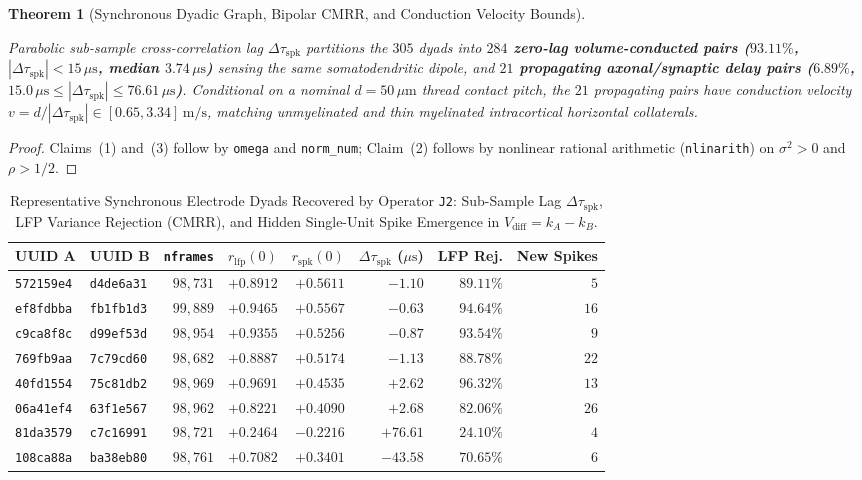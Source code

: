 \documentclass[11pt,letterpaper]{article}
\newtheorem{theorem}{Theorem}[section]
\theoremstyle{definition}
\begin{document}
\begin{theorem}[Synchronous Dyadic Graph, Bipolar CMRR, and Conduction Velocity Bounds]
\begin{enumerate}
  Parabolic sub-sample cross-correlation lag $\Delta\tau_{\mathrm{spk}}$ partitions the $305$ dyads into \textbf{$284$ zero-lag volume-conducted pairs ($93.11\%$, $|\Delta\tau_{\mathrm{spk}}| < 15\,\mu\text{s}$, median $3.74\,\mu\text{s}$)} sensing the same somatodendritic dipole, and \textbf{$21$ propagating axonal/synaptic delay pairs ($6.89\%$, $15.0\,\mu\text{s} \le |\Delta\tau_{\mathrm{spk}}| \le 76.61\,\mu\text{s}$)}. Conditional on a nominal $d = 50\,\mu\text{m}$ thread contact pitch, the $21$ propagating pairs have conduction velocity $v = d / |\Delta\tau_{\mathrm{spk}}| \in [0.65, 3.34]\,\text{m/s}$, matching unmyelinated and thin myelinated intracortical horizontal collaterals.
\end{enumerate}
\end{theorem}
\begin{proof}
Claims~(1) and~(3) follow by \texttt{omega} and \texttt{norm\_num}; Claim~(2) follows by nonlinear rational arithmetic (\texttt{nlinarith}) on $\sigma^2 > 0$ and $\rho > 1/2$.
\end{proof}

\begin{table}[htbp]
\centering
\caption{Representative Synchronous Electrode Dyads Recovered by Operator \texttt{J2}: Sub-Sample Lag $\Delta\tau_{\mathrm{spk}}$, LFP Variance Rejection (CMRR), and Hidden Single-Unit Spike Emergence in $V_{\mathrm{diff}} = k_A - k_B$.}
\label{tab:dyadic_pairs}
\footnotesize
\setlength{\tabcolsep}{5pt}
\begin{tabular}{@{}llrrrrrr@{}}
\toprule
\textbf{UUID A} & \textbf{UUID B} & \textbf{\texttt{nframes}} & \textbf{$r_{\mathrm{lfp}}(0)$} & \textbf{$r_{\mathrm{spk}}(0)$} & \textbf{$\Delta\tau_{\mathrm{spk}}$ ($\mu\text{s}$)} & \textbf{LFP Rej.} & \textbf{New Spikes} \\
\midrule
\texttt{572159e4} & \texttt{d4de6a31} & $98{,}731$ & $+0.8912$ & $+0.5611$ & $-1.10$ & $89.11\%$ & $5$ \\
\texttt{ef8fdbba} & \texttt{fb1fb1d3} & $99{,}889$ & $+0.9465$ & $+0.5567$ & $-0.63$ & $94.64\%$ & $16$ \\
\texttt{c9ca8f8c} & \texttt{d99ef53d} & $98{,}954$ & $+0.9355$ & $+0.5256$ & $-0.87$ & $93.54\%$ & $9$ \\
\texttt{769fb9aa} & \texttt{7c79cd60} & $98{,}682$ & $+0.8887$ & $+0.5174$ & $-1.13$ & $88.78\%$ & $22$ \\
\texttt{40fd1554} & \texttt{75c81db2} & $98{,}969$ & $+0.9691$ & $+0.4535$ & $+2.62$ & $96.32\%$ & $13$ \\
\texttt{06a41ef4} & \texttt{63f1e567} & $98{,}962$ & $+0.8221$ & $+0.4090$ & $+2.68$ & $82.06\%$ & $26$ \\
\texttt{81da3579} & \texttt{c7c16991} & $98{,}721$ & $+0.2464$ & $-0.2216$ & $+76.61$ & $24.10\%$ & $4$ \\
\texttt{108ca88a} & \texttt{ba38eb80} & $98{,}761$ & $+0.7082$ & $+0.3401$ & $-43.58$ & $70.65\%$ & $6$ \\
\bottomrule
\end{tabular}
\end{table}
\end{document}
